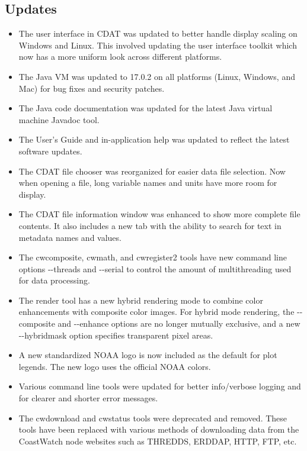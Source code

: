 \subsection*{ Updates}

\begin{itemize}
  
  \item The user interface in CDAT was updated to better handle display 
  scaling on Windows and Linux.  This involved updating the user interface
  toolkit which now has a more uniform look across different platforms.

  \item The Java VM was updated to 17.0.2 on all platforms (Linux, Windows,
  and Mac) for bug fixes and security patches.

  \item The Java code documentation was updated for the latest Java 
  virtual machine Javadoc tool.

  \item The User's Guide and in-application help was updated to reflect the 
  latest software updates.

  \item The CDAT file chooser was reorganized for easier data file selection.
  Now when opening a file, long variable names and units have more room for 
  display.

  \item The CDAT file information window was enhanced to show more complete
  file contents.  It also includes a new tab with the ability to search for text
  in metadata names and values.

  \item The cwcomposite, cwmath, and cwregister2 tools have new command line
  options -{-}threads and -{-}serial to control the amount of multithreading
  used for data processing.

  \item The render tool has a new hybrid rendering mode to combine color
  enhancements with composite color images.  For hybrid mode rendering, 
  the -{-}composite and -{-}enhance options are no longer mutually exclusive, 
  and a new -{-}hybridmask option specifies transparent pixel areas.

  \item A new standardized NOAA logo is now included as the default
  for plot legends.  The new logo uses the official NOAA colors.

  \item Various command line tools were updated for better info/verbose logging
  and for clearer and shorter error messages.

  \item The cwdownload and cwstatus tools were deprecated and removed.
  These tools have been replaced with various methods of downloading
  data from the CoastWatch node websites such as THREDDS, ERDDAP, HTTP, FTP,
  etc.

\end{itemize}

